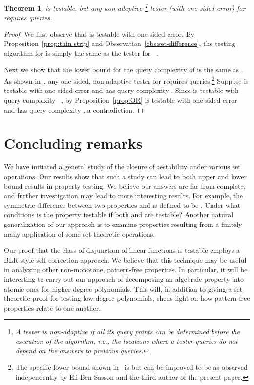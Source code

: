 \documentclass[11pt,english]{article}
\newtheorem{theorem}{Theorem}
\theoremstyle{definition}
\theoremstyle{remark}
\begin{document}
\begin{theorem}\label{thm:LB} 
 is testable, but any non-adaptive
\footnote{A tester is non-adaptive if all its query points 
can be determined before the execution of the algorithm, 
i.e., the locations where a tester queries do not depend on the answers to previous queries.}
tester (with one-sided error) for  requires 
queries. 
\end{theorem}
\begin{proof} 
We first observe that  is testable with one-sided error. 
By Proposition~\ref{prop:thin strip} and Observation~\ref{obs:set-difference},
the testing algorithm for  is simply the same as the tester
for ~\cite{Gre05}. 

Next we show that the lower bound for the query complexity of 
is the same as . 
As shown in~\cite{BX10}, any one-sided, non-adaptive tester for 
 requires  queries.\footnote{The specific lower bound shown in~\cite{BX10} is 
 but can be 
improved to be  
as observed independently by Eli Ben-Sasson and the third author of the present paper.}
Suppose  is testable with one-sided error and has query complexity
.
Since  is testable with
query complexity ~\cite{BLR93}, by Proposition~\ref{prop:OR} 
is testable with one-sided error and has query complexity ,
a contradiction. \end{proof}



\section{\texorpdfstring{Concluding remarks}{5. Concluding remarks}}
\label{Sec:conclusion} 
We have initiated a general study of the closure
of testability under various set operations.  Our results show that
such a study can lead to both upper and lower bound results in property
testing. We believe our answers are far from complete, and further
investigation may lead to more interesting results. For example, the
symmetric difference between two properties  and 
is defined to be .
Under what conditions is the property 
testable if both  and  are testable? Another natural
generalization of our approach is to examine properties resulting
from a finitely many application of some set-theoretic operations. 

Our proof that the class of disjunction of linear functions is testable employs a BLR-style
self-correction approach. 
We believe that this technique may be useful in analyzing other non-monotone, pattern-free properties. 
In particular, it will be interesting to carry out our approach of decomposing
an algebraic property into atomic ones for higher degree polynomials. 
This will, in addition to giving a set-theoretic proof for testing low-degree polynomials, 
sheds light on how pattern-free properties relate to one another.
\end{document}
